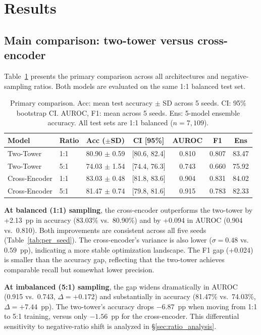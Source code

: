 \documentclass[10pt,twocolumn]{article}
\begin{document}
\section{Results}
\label{sec:results}

\subsection{Main comparison: two-tower versus cross-encoder}
\label{sec:main_results}

Table~\ref{tab:main_comparison} presents the primary comparison across all
architectures and negative-sampling ratios.
Both models are evaluated on the same 1:1 balanced test set.

\begin{table}[!htbp]
\centering
\caption{Primary comparison. Acc: mean test accuracy $\pm$ SD across 5 seeds.
CI: 95\% bootstrap CI. AUROC, F1: mean across 5 seeds. Ens: 5-model ensemble
accuracy. All test sets are 1:1 balanced ($n = 7{,}109$).}
\label{tab:main_comparison}
\small
\begin{tabular}{@{}llccccc@{}}
\toprule
\textbf{Model} & \textbf{Ratio} & \textbf{Acc ($\pm$SD)} & \textbf{CI [95\%]} & \textbf{AUROC} & \textbf{F1} & \textbf{Ens} \\
\midrule
Two-Tower    & 1:1 & 80.90 $\pm$ 0.59 & [80.6, 82.4] & 0.810 & 0.807 & 83.47 \\
Two-Tower    & 5:1 & 74.03 $\pm$ 1.54 & [74.4, 76.3] & 0.743 & 0.660 & 75.92 \\
\midrule
Cross-Encoder & 1:1 & 83.03 $\pm$ 0.48 & [81.8, 83.6] & 0.904 & 0.831 & 84.02 \\
Cross-Encoder & 5:1 & 81.47 $\pm$ 0.74 & [79.8, 81.6] & 0.915 & 0.783 & 82.33 \\
\bottomrule
\end{tabular}
\end{table}

\textbf{At balanced (1:1) sampling}, the cross-encoder outperforms the two-tower
by +2.13~pp in accuracy (83.03\% vs.\ 80.90\%) and by +0.094 in AUROC
(0.904 vs.\ 0.810).
Both improvements are consistent across all five seeds (Table~\ref{tab:per_seed}).
The cross-encoder's variance is also lower ($\sigma = 0.48$ vs.\ $0.59$~pp),
indicating a more stable optimization landscape.
The F1 gap (+0.024) is smaller than the accuracy gap, reflecting that the
two-tower achieves comparable recall but somewhat lower precision.

\textbf{At imbalanced (5:1) sampling}, the gap widens dramatically in AUROC
(0.915 vs.\ 0.743, $\Delta = +0.172$) and substantially in accuracy
(81.47\% vs.\ 74.03\%, $\Delta = +7.44$~pp).
The two-tower's accuracy drops $-6.87$~pp when moving from 1:1 to 5:1 training,
versus only $-1.56$~pp for the cross-encoder.
This differential sensitivity to negative-ratio shift is analyzed in \S\ref{sec:ratio_analysis}.
\end{document}
